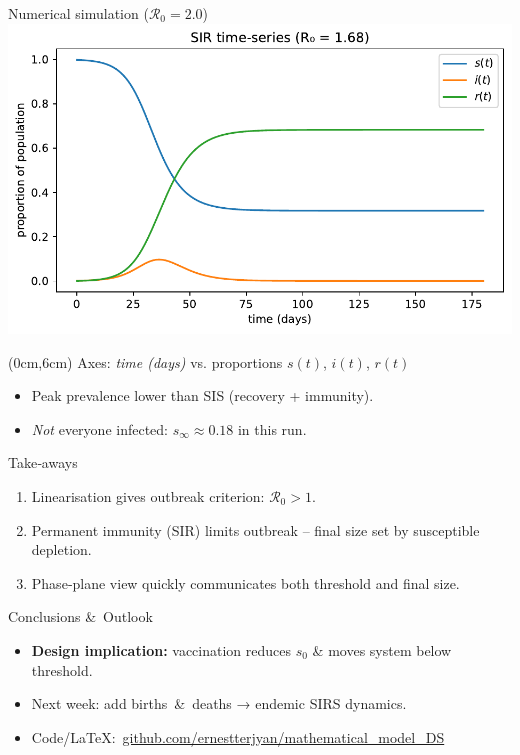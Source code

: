 \documentclass[14pt,aspectratio=169]{beamer}
\newcommand{\RR}{\mathcal{R}_0}
\begin{document}
\begin{frame}{Numerical simulation ($\RR=2.0$)}
  \centering
  \includegraphics{SIR_Timeseries.pdf}
  \begin{textblock*}{\textwidth}(0cm,6cm)
    {\scriptsize Axes: \emph{time (days)} vs. proportions $s(t)$, $i(t)$, $r(t)$}
  \end{textblock*}
  \vspace{-0.3em}
  \begin{itemize}
    \item Peak prevalence lower than SIS (recovery + immunity).
    \item \emph{Not} everyone infected: $s_\infty\approx0.18$ in this run.
  \end{itemize}
\end{frame}
\begin{frame}{Take‑aways}
  \begin{enumerate}
    \item Linearisation gives outbreak criterion: \alert{$\RR>1$}.
    \item Permanent immunity (SIR) limits outbreak – final size set by susceptible depletion.
    \item Phase‑plane view quickly communicates both threshold and final size.
  \end{enumerate}
\end{frame}

\begin{frame}{Conclusions \& Outlook}
  \begin{itemize}
    \item \textbf{Design implication:} vaccination reduces $s_0$ \& moves system below threshold.
    \item Next week: add births \& deaths → endemic SIRS dynamics.
    \item Code/\LaTeX:\ \href{https://github.com/ernestterjyan/mathematical_model_DS}{github.com/ernestterjyan/mathematical\_model\_DS}
  \end{itemize}
  \vfill
\end{frame}
\end{document}
